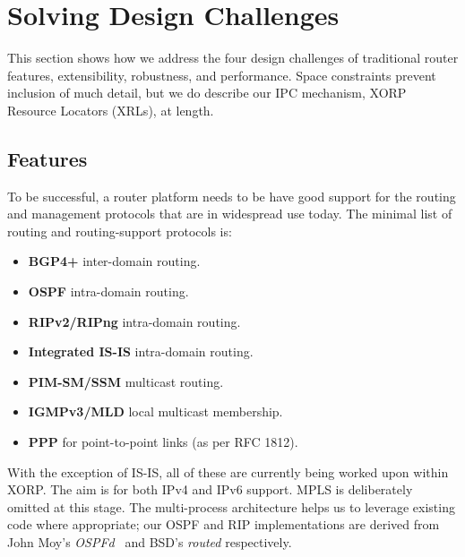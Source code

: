 \section{Solving Design Challenges}

This section shows how we address the four design challenges of traditional
router features, extensibility, robustness, and performance.
Space constraints prevent inclusion of much detail, but we do
describe our IPC mechanism, XORP Resource Locators (XRLs), at length.


\subsection{Features}

To be successful, a router platform needs to be have good support
for the routing and management protocols that are in widespread use
today.  The minimal list of routing and routing-support protocols is:
\begin{itemize}\addtolength{\itemsep}{-0.5\baselineskip}
\item{\bf BGP4+}
inter-domain routing.
\item{\bf OSPF}
intra-domain routing.
\item{\bf RIPv2/RIPng}
intra-domain routing.
\item{\bf Integrated IS-IS}
intra-domain routing.
\item{\bf PIM-SM/SSM}
multicast routing.
\item{\bf IGMPv3/MLD}
local multicast membership.
\item{\bf PPP}
for point-to-point links (as per RFC 1812).
\end{itemize}

With the exception of IS-IS, all of these are currently being worked
upon within XORP.  The aim is for both IPv4 and
IPv6 support.  MPLS is deliberately omitted at
this stage.  The multi-process architecture helps us to leverage 
existing code where
appropriate;  our OSPF and RIP implementations are derived from John
Moy's {\it OSPFd}~\cite{ospfd} and BSD's {\it routed} respectively.

